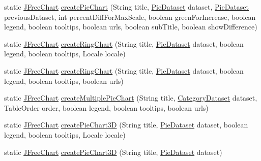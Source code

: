 \begin{DoxyCompactItemize}
\item 
static \mbox{\hyperlink{classorg_1_1jfree_1_1chart_1_1_j_free_chart}{J\+Free\+Chart}} \mbox{\hyperlink{classorg_1_1jfree_1_1chart_1_1_chart_factory_a84039717acb9cc2c40d16bc07a229326}{create\+Pie\+Chart}} (String title, \mbox{\hyperlink{interfaceorg_1_1jfree_1_1data_1_1general_1_1_pie_dataset}{Pie\+Dataset}} dataset, \mbox{\hyperlink{interfaceorg_1_1jfree_1_1data_1_1general_1_1_pie_dataset}{Pie\+Dataset}} previous\+Dataset, int percent\+Diff\+For\+Max\+Scale, boolean green\+For\+Increase, boolean legend, boolean tooltips, boolean urls, boolean sub\+Title, boolean show\+Difference)
\item 
static \mbox{\hyperlink{classorg_1_1jfree_1_1chart_1_1_j_free_chart}{J\+Free\+Chart}} \mbox{\hyperlink{classorg_1_1jfree_1_1chart_1_1_chart_factory_a0b363ba6b46d707abc3d76a67e7897ef}{create\+Ring\+Chart}} (String title, \mbox{\hyperlink{interfaceorg_1_1jfree_1_1data_1_1general_1_1_pie_dataset}{Pie\+Dataset}} dataset, boolean legend, boolean tooltips, Locale locale)
\item 
static \mbox{\hyperlink{classorg_1_1jfree_1_1chart_1_1_j_free_chart}{J\+Free\+Chart}} \mbox{\hyperlink{classorg_1_1jfree_1_1chart_1_1_chart_factory_a7e2ee8163b27b8356ec5b2d317b9ee23}{create\+Ring\+Chart}} (String title, \mbox{\hyperlink{interfaceorg_1_1jfree_1_1data_1_1general_1_1_pie_dataset}{Pie\+Dataset}} dataset, boolean legend, boolean tooltips, boolean urls)
\item 
static \mbox{\hyperlink{classorg_1_1jfree_1_1chart_1_1_j_free_chart}{J\+Free\+Chart}} \mbox{\hyperlink{classorg_1_1jfree_1_1chart_1_1_chart_factory_a219b98f7b4c551de5f52a90b8f16d821}{create\+Multiple\+Pie\+Chart}} (String title, \mbox{\hyperlink{interfaceorg_1_1jfree_1_1data_1_1category_1_1_category_dataset}{Category\+Dataset}} dataset, Table\+Order order, boolean legend, boolean tooltips, boolean urls)
\item 
static \mbox{\hyperlink{classorg_1_1jfree_1_1chart_1_1_j_free_chart}{J\+Free\+Chart}} \mbox{\hyperlink{classorg_1_1jfree_1_1chart_1_1_chart_factory_ad460e2a5b41dea8624411a278741f26a}{create\+Pie\+Chart3D}} (String title, \mbox{\hyperlink{interfaceorg_1_1jfree_1_1data_1_1general_1_1_pie_dataset}{Pie\+Dataset}} dataset, boolean legend, boolean tooltips, Locale locale)
\item 
static \mbox{\hyperlink{classorg_1_1jfree_1_1chart_1_1_j_free_chart}{J\+Free\+Chart}} \mbox{\hyperlink{classorg_1_1jfree_1_1chart_1_1_chart_factory_af9fdc0113f45f1038e8c264eb889597d}{create\+Pie\+Chart3D}} (String title, \mbox{\hyperlink{interfaceorg_1_1jfree_1_1data_1_1general_1_1_pie_dataset}{Pie\+Dataset}} dataset)

\end{DoxyCompactItemize}

